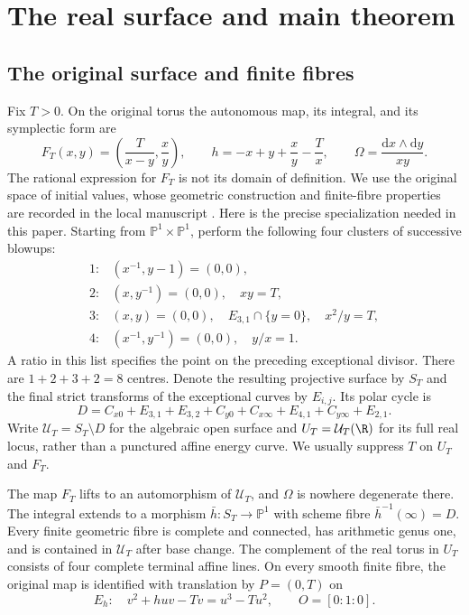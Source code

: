 \section{The real surface and main theorem}
\label{sec:surface}

\subsection{The original surface and finite fibres}

Fix $T>0$. On the original torus the autonomous map, its integral,
and its symplectic form are
\begin{equation}
 F_T(x,y)=\left(\frac{T}{x-y},\frac{x}{y}\right),\qquad
 h=-x+y+\frac{x}{y}-\frac{T}{x},\qquad
 \Omega=\frac{\mathrm dx\wedge\mathrm dy}{xy}.
 \label{eq:map}
\end{equation}
The rational expression for $F_T$ is not its domain of definition.
We use the original space of initial values, whose geometric construction
and finite-fibre properties are recorded in the local manuscript
\cite[Section 2]{QPI30Local2026}. Here is the precise specialization
needed in this paper. Starting from $\mathbb P^1\times\mathbb P^1$,
perform the following four clusters of successive blowups:
\[
\begin{array}{cl}
1:&(x^{-1},y-1)=(0,0),\\
2:&(x,y^{-1})=(0,0),\quad xy=T,\\
3:&(x,y)=(0,0),\quad E_{3,1}\cap\{y=0\},\quad x^2/y=T,\\
4:&(x^{-1},y^{-1})=(0,0),\quad y/x=1.
\end{array}
\]
A ratio in this list specifies the point on the preceding exceptional
divisor. There are $1+2+3+2=8$ centres. Denote the resulting projective
surface by $S_T$ and the final strict transforms of the exceptional
curves by $E_{i,j}$. Its polar cycle is
\[
D=C_{x0}+E_{3,1}+E_{3,2}+C_{y0}+C_{x\infty}
  +E_{4,1}+C_{y\infty}+E_{2,1}.
\]
Write $\mathcal U_T=S_T\setminus D$ for the algebraic open surface
and $U_T=\mathcal U_T(\R)$ for its full real locus, rather than a
punctured affine energy curve. We usually suppress $T$ on $U_T$ and $F_T$.

\begin{proposition}\label{prop:surface}
The map $F_T$ lifts to an automorphism of $\mathcal U_T$, and $\Omega$
is nowhere degenerate there. The integral extends to a morphism
$\bar h:S_T\to\mathbb P^1$ with scheme fibre $\bar h^{-1}(\infty)=D$.
Every finite geometric fibre is complete and connected, has arithmetic
genus one, and is contained in $\mathcal U_T$ after base change.
The complement of the real torus in $U_T$
consists of four complete terminal affine lines. On every smooth
finite fibre, the original map is identified with translation by
$P=(0,T)$ on
\begin{equation}
 E_h:\quad v^2+huv-Tv=u^3-Tu^2,\qquad O=[0:1:0].
 \label{eq:weierstrass}
\end{equation}
\end{proposition}


